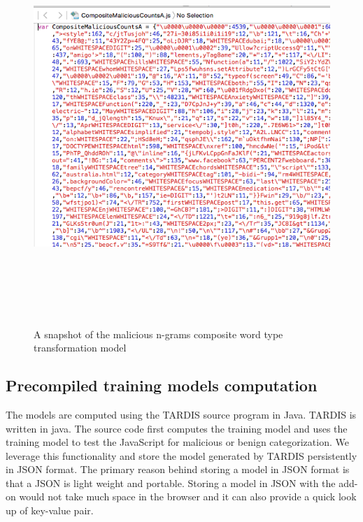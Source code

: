 \begin{figure}[htb]
\centering
\includegraphics[width=16cm,height=15cm,keepaspectratio]{image/composite.png}
\caption[A snapshot of the malicious n-grams composite word type transformation model ]{A snapshot of the malicious n-grams composite word type transformation model} 
\label{fig:composite}
\end{figure}

\subsection{Precompiled training models computation}

The models are computed using the TARDIS source program in Java. TARDIS is written in java. The source code first computes the training model and uses the training model to test the JavaScript for malicious or benign categorization. We leverage this functionality and store the model generated by TARDIS persistently in JSON format. The primary reason behind storing a model in JSON format is that a JSON is light weight and portable. Storing a model in JSON with the add-on would not take much space in the browser and it can also provide a quick look up of key-value pair.

